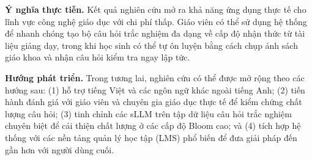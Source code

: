 \textbf{Ý nghĩa thực tiễn.} Kết quả nghiên cứu mở ra khả năng ứng dụng thực tế cho lĩnh vực công nghệ giáo dục với chi phí thấp. Giáo viên có thể sử dụng hệ thống để nhanh chóng tạo bộ câu hỏi trắc nghiệm đa dạng về cấp độ nhận thức từ tài liệu giảng dạy, trong khi học sinh có thể tự ôn luyện bằng cách chụp ảnh sách giáo khoa và nhận câu hỏi kiểm tra ngay lập tức.

\textbf{Hướng phát triển.} Trong tương lai, nghiên cứu có thể được mở rộng theo các hướng sau: (1) hỗ trợ tiếng Việt và các ngôn ngữ khác ngoài tiếng Anh; (2) tiến hành đánh giá với giáo viên và chuyên gia giáo dục thực tế để kiểm chứng chất lượng câu hỏi; (3) tinh chỉnh các sLLM trên tập dữ liệu câu hỏi trắc nghiệm chuyên biệt để cải thiện chất lượng ở các cấp độ Bloom cao; và (4) tích hợp hệ thống với các nền tảng quản lý học tập (LMS) phổ biến để đưa giải pháp đến gần hơn với người dùng cuối.
